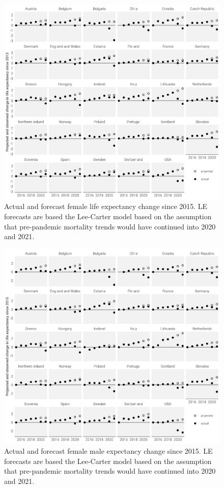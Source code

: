 \documentclass[12pt]{article}
\begin{document}
\begin{figure}[ht!]
    \centering
    \includegraphics{90-e0forecastF.pdf}
    \caption{Actual and forecast female life expectancy change since 2015. LE forecasts are based the Lee-Carter model based on the assumption that pre-pandemic mortality trends would have continued into 2020 and 2021.}
    \label{fig:e0forecastF}
\end{figure}

\begin{figure}[ht!]
    \centering
    \includegraphics{90-e0forecastM.pdf}
    \caption{Actual and forecast female male expectancy change since 2015. LE forecasts are based the Lee-Carter model based on the assumption that pre-pandemic mortality trends would have continued into 2020 and 2021.}
    \label{fig:e0forecastM}
\end{figure}
\end{document}
